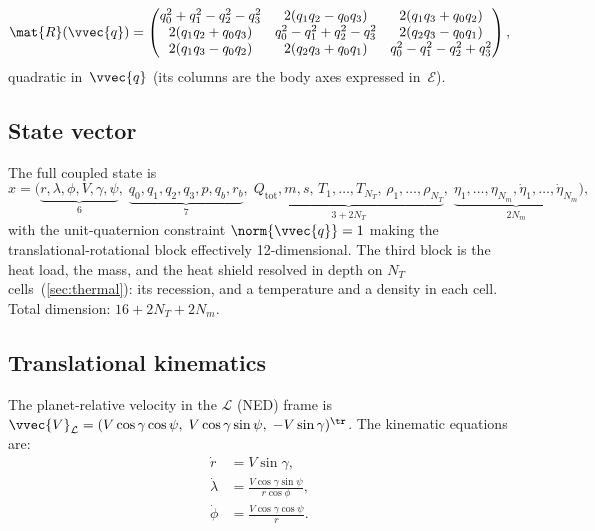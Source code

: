 \begin{equation}\label{eq:DCM}
  \mat{R}(\vvec{q})
  = \begin{pmatrix}
      q_0^2+q_1^2-q_2^2-q_3^2 & 2(q_1q_2-q_0q_3) & 2(q_1q_3+q_0q_2)\\
      2(q_1q_2+q_0q_3) & q_0^2-q_1^2+q_2^2-q_3^2 & 2(q_2q_3-q_0q_1)\\
      2(q_1q_3-q_0q_2) & 2(q_2q_3+q_0q_1) & q_0^2-q_1^2-q_2^2+q_3^2
    \end{pmatrix},
\end{equation}
quadratic in~$\vvec{q}$ (its columns are the body axes expressed
in~$\mathcal{E}$).


\subsection{State vector}\label{sec:state-vector}

The full coupled state is
\begin{equation}\label{eq:state-full}
  x = \bigl(\underbrace{r,\lambda,\phi,V,\gamma,\psi}_{6},\;
       \underbrace{q_0,q_1,q_2,q_3,p,q_b,r_b}_{7},\;
       \underbrace{Q_{\mathrm{tot}},m,s,\,
                   T_1,\dots,T_{N_T},\,\rho_1,\dots,\rho_{N_T}}_{3+2N_T},\;
       \underbrace{\eta_1,\dots,\eta_{N_m},
                   \dot\eta_1,\dots,\dot\eta_{N_m}}_{2N_m}\bigr),
\end{equation}
with the unit-quaternion constraint $\norm{\vvec{q}}=1$ making the
translational-rotational block effectively 12-dimensional. The third block
is the heat load, the mass, and the heat shield resolved in depth on $N_T$
cells~(\cref{sec:thermal}): its recession, and a temperature and a density
in each cell. Total dimension: $16 + 2N_T + 2N_m$.


\subsection{Translational kinematics}\label{sec:trans-kin}

The planet-relative velocity in the $\mathcal{L}$ (NED) frame is
$\vvec{V}_{\mathcal{L}} =
(V\cos\gamma\cos\psi,\;V\cos\gamma\sin\psi,\;-V\sin\gamma)^\tr$. The
kinematic equations are:
\begin{align}
  \dot r      &= V\sin\gamma, \label{eq:rdot}\\
  \dot\lambda &= \frac{V\cos\gamma\sin\psi}{r\cos\phi},
                                                         \label{eq:lamdot}\\
  \dot\phi    &= \frac{V\cos\gamma\cos\psi}{r}.         \label{eq:phidot}
\end{align}


